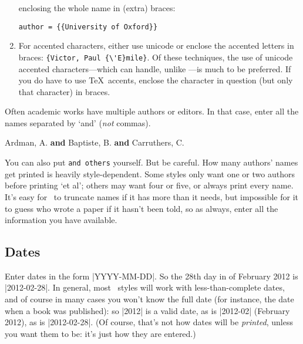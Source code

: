\begin{enumerate}
  enclosing the whole name in (extra) braces:
\begin{center}
\verb|author = {{University of Oxford}}|
\end{center}
\item For accented characters, either use unicode or enclose the
  accented letters in braces: \verb|{Victor, Paul {\'E}mile}|. Of
  these techniques, the use of unicode accented characters---which
   can handle, unlike \bibtex---is much to be
  preferred. If you do have to use \TeX\ accents, enclose the
  character in question (but only that character) in braces.
\end{enumerate} 

Often academic works have multiple authors or editors. In that case,
enter all the names separated by `and' (\emph{not} commas).
\begin{center}
\ttfamily
Ardman, A. \textbf{and} Baptiste, B. \textbf{and} Carruthers, C.
\end{center}

You can also put \verb|and others| yourself. But be careful. How many
authors' names get printed is heavily style-dependent. Some styles only want one or two authors before
printing `et al'; others may want four or five, or always print every
name. It's easy for \biblatex\ to truncate names if it has more than
it needs, but impossible for it to guess who wrote a paper if it
hasn't been told, so as always, enter all the information you have
available.

\subsection{Dates}

Enter dates in the form |YYYY-MM-DD|. So the 28th day in
of February 2012 is |2012-02-28|. In general, most \biblatex\ styles
will work with less-than-complete dates, and of course in many cases
you won't know the full date (for instance, the date when a book was
published): so |2012| is a valid date, as is |2012-02| (February
2012), as is |2012-02-28|. (Of course, that's not how dates will be
\emph{printed}, unless you want them to be: it's just how they are
entered.)

